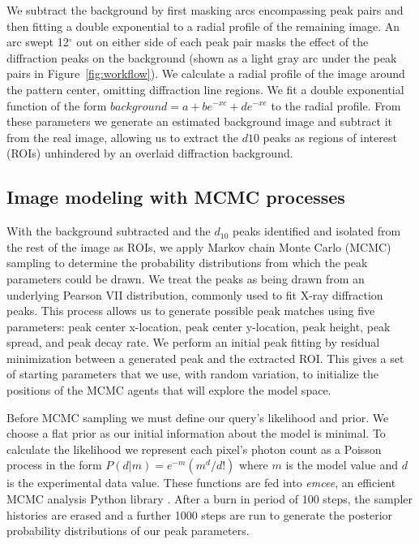 \documentclass{sig-alternate}
\begin{document}
We subtract the background by first masking arcs encompassing peak
pairs and then fitting a double exponential to a radial profile of the
remaining image. An arc swept 12$^\circ$ out on either side of each
peak pair masks the effect of the diffraction peaks on the background
(shown as a light gray arc under the peak pairs in
Figure~\ref{fig:workflow}). We calculate a radial profile of the image
around the pattern center, omitting diffraction line regions. We fit a
double exponential function of the form $background = a+ b e^{-x c} +
d e^{-x e}$ to the radial profile. From these parameters we generate
an estimated background image and subtract it from the real image,
allowing us to extract the $d{10}$ peaks as regions of interest (ROIs)
unhindered by an overlaid diffraction background.

\subsection{Image modeling with MCMC processes}

With the background subtracted and the $d_{10}$ peaks identified and
isolated from the rest of the image as ROIs, we apply Markov chain
Monte Carlo (MCMC) sampling to determine the probability distributions
from which the peak parameters could be drawn. We treat the peaks as
being drawn from an underlying Pearson VII distribution, commonly used
to fit X-ray diffraction peaks. This process allows us to generate
possible peak matches using five parameters: peak center x-location,
peak center y-location, peak height, peak spread, and peak decay rate.
We perform an initial peak fitting by residual minimization between a
generated peak and the extracted ROI. This gives a set of starting
parameters that we use, with random variation, to initialize the
positions of the MCMC agents that will explore the model space. 

Before MCMC sampling we must define our query's likelihood and prior.
We choose a flat prior as our initial information about the model is
minimal. To calculate the likelihood we represent each pixel's photon
count as a Poisson process in the form $P(d|m)=e^{-m}
\left(m^{d}/d!\right)$ where $m$ is the model value and $d$ is the
experimental data value. These functions are fed into \textit{emcee},
an efficient MCMC analysis Python library \cite{ForemanMackey2013}.
After a burn in period of 100 steps, the sampler histories are erased
and a further 1000 steps are run to generate the posterior probability
distributions of our peak parameters. 
\end{document}
